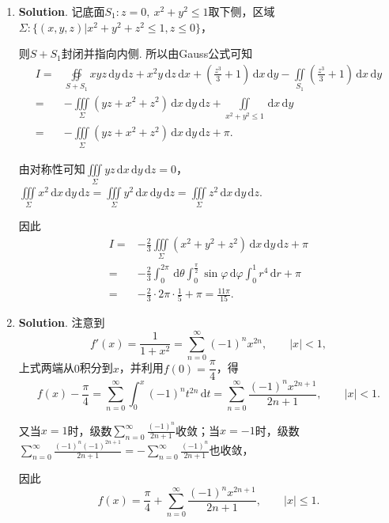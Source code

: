 \documentclass[../main.tex]{subfiles}
\begin{document}
\begin{enumerate}
    \item \textbf{Solution}. 记底面$S_1:z=0,\ x^2+y^2\le1$取下侧，区域$\Sigma:\{(x,y,z)|x^2+y^2+z^2\le1, z\le0\}$，

          则$S+S_1$封闭并指向内侧. 所以由Gauss公式可知
          \[
              \begin{aligned}
                  I={} & \oiint\limits_{S+S_1}xyz\,\mathrm{d}y\,\mathrm{d}z+x^{2}y\,\mathrm{d}z\,\mathrm{d}x+\left(\frac{z^{3}}{3}+1\right)\,\mathrm{d}x\,\mathrm{d}y-\iint\limits_{S_1}\left(\frac{z^{3}}{3}+1\right)\,\mathrm{d}x\,\mathrm{d}y \\
                  ={}  & -\iiint\limits_{\Sigma} \left(yz+x^2+z^2\right)\,\mathrm{d}x\,\mathrm{d}y\,\mathrm{d}z+\iint\limits_{x^2+y^2\le1}\,\mathrm{d}x\,\mathrm{d}y                                                                             \\
                  ={}  & -\iiint\limits_{\Sigma} \left(yz+x^2+z^2\right)\,\mathrm{d}x\,\mathrm{d}y\,\mathrm{d}z+ \pi.
              \end{aligned}
          \]

          由对称性可知$\iiint\limits_{\Sigma}yz\,\mathrm{d}x\,\mathrm{d}y\,\mathrm{d}z=0$，$\iiint\limits_{\Sigma}x^2\,\mathrm{d}x\,\mathrm{d}y\,\mathrm{d}z=\iiint\limits_{\Sigma}y^2\,\mathrm{d}x\,\mathrm{d}y\,\mathrm{d}z=\iiint\limits_{\Sigma}z^2\,\mathrm{d}x\,\mathrm{d}y\,\mathrm{d}z$.

          因此
          \[
              \begin{aligned}
                  I={} & -\frac{2}{3}\iiint\limits_{\Sigma}\left(x^2+y^2+z^2\right)\,\mathrm{d}x\,\mathrm{d}y\,\mathrm{d}z+\pi                               \\
                  ={}  & -\frac{2}{3}\int_{0}^{2\pi}\,\mathrm{d}\theta\int_{0}^{\frac{\pi}{2}}\sin\varphi\,\mathrm{d}\varphi\int_{0}^{1}r^4\,\mathrm{d}r+\pi \\
                  ={}  & -\frac{2}{3}\cdot 2\pi\cdot \frac{1}{5}+\pi=\frac{11\pi}{15}.
              \end{aligned}
          \]

    \item \textbf{Solution}. 注意到
          \[
              f'(x)=\frac{1}{1+x^2}=\sum_{n=0}^{\infty}(-1)^nx^{2n},\qquad |x|<1,
          \]
          上式两端从$0$积分到$x$，并利用$f(0)=\dfrac{\pi}{4}$，得
          \[
              f(x)-\frac{\pi}{4}=\sum_{n=0}^{\infty}\int_{0}^{x}(-1)^nt^{2n}\,\mathrm{d}t=\sum_{n=0}^{\infty}\frac{(-1)^nx^{2n+1}}{2n+1},\qquad |x|<1.
          \]

          又当$x=1$时，级数$\sum_{n=0}^{\infty}\frac{(-1)^n}{2n+1}$收敛；当$x=-1$时，级数$\sum_{n=0}^{\infty}\frac{(-1)^n(-1)^{2n+1}}{2n+1}=-\sum_{n=0}^{\infty}\frac{(-1)^n}{2n+1}$也收敛，

          因此
          \[
              f(x)=\frac{\pi}{4}+\sum_{n=0}^{\infty}\frac{(-1)^nx^{2n+1}}{2n+1},\qquad |x|\le1.
          \]

\end{enumerate}
\end{document}
